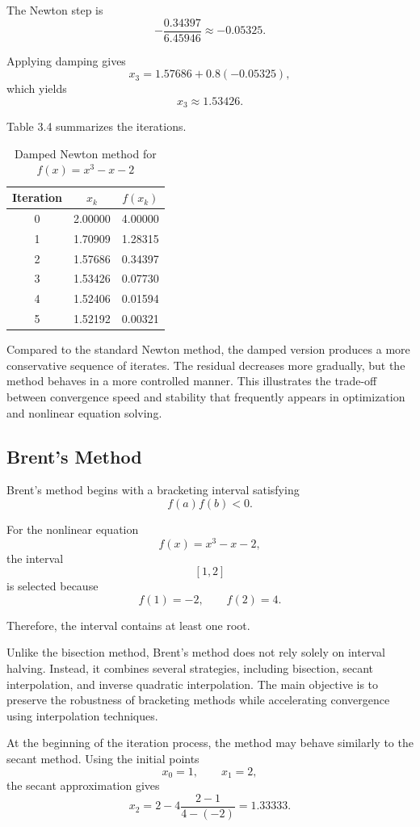 The Newton step is
\[
-\frac{0.34397}{6.45946}
\approx
-0.05325.
\]

Applying damping gives
\[
x_3
=
1.57686
+
0.8(-0.05325),
\]
which yields
\[
x_3
\approx
1.53426.
\]

Table 3.4 summarizes the iterations.

\begin{table}[h!]
\centering
\caption{Damped Newton method for \(f(x)=x^3-x-2\)}
\label{tab:damped_newton_example}
\begin{tabular}{|c|c|c|}
\hline
Iteration & \(x_k\) & \(f(x_k)\) \\ \hline
0 & 2.00000 & 4.00000 \\ \hline
1 & 1.70909 & 1.28315 \\ \hline
2 & 1.57686 & 0.34397 \\ \hline
3 & 1.53426 & 0.07730 \\ \hline
4 & 1.52406 & 0.01594 \\ \hline
5 & 1.52192 & 0.00321 \\ \hline
\end{tabular}
\end{table}

Compared to the standard Newton method, the damped version produces a more conservative sequence of iterates. The residual decreases more gradually, but the method behaves in a more controlled manner. This illustrates the trade-off between convergence speed and stability that frequently appears in optimization and nonlinear equation solving.

\subsection{Brent's Method}

Brent's method begins with a bracketing interval satisfying
\[
f(a)f(b)<0.
\]

For the nonlinear equation
\[
f(x)=x^3-x-2,
\]
the interval
\[
[1,2]
\]
is selected because
\[
f(1)=-2,
\qquad
f(2)=4.
\]

Therefore, the interval contains at least one root.

Unlike the bisection method, Brent's method does not rely solely on interval halving. Instead, it combines several strategies, including bisection, secant interpolation, and inverse quadratic interpolation. The main objective is to preserve the robustness of bracketing methods while accelerating convergence using interpolation techniques.

At the beginning of the iteration process, the method may behave similarly to the secant method. Using the initial points
\[
x_0=1,
\qquad
x_1=2,
\]
the secant approximation gives
\[
x_2
=
2
-
4
\frac{2-1}{4-(-2)}
=
1.33333.
\]

